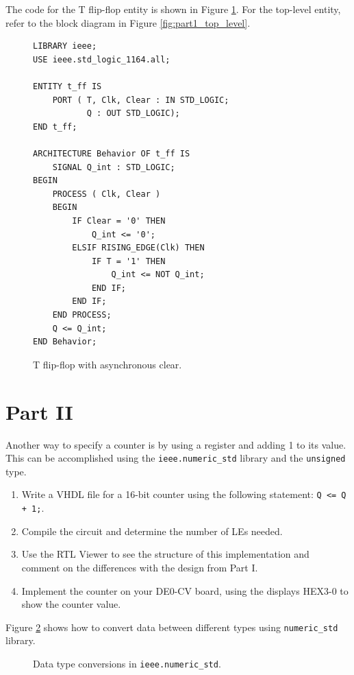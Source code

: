 \documentclass{article}
\begin{document}
The code for the T flip-flop entity is shown in Figure \ref{fig:t_ff_code}.
For the top-level entity, refer to the block diagram in Figure \ref{fig:part1_top_level}.

\begin{figure}[H]
    \centering
    \begin{verbatim}
LIBRARY ieee;
USE ieee.std_logic_1164.all;

ENTITY t_ff IS
    PORT ( T, Clk, Clear : IN STD_LOGIC;
           Q : OUT STD_LOGIC);
END t_ff;

ARCHITECTURE Behavior OF t_ff IS
    SIGNAL Q_int : STD_LOGIC;
BEGIN
    PROCESS ( Clk, Clear )
    BEGIN
        IF Clear = '0' THEN
            Q_int <= '0';
        ELSIF RISING_EDGE(Clk) THEN
            IF T = '1' THEN
                Q_int <= NOT Q_int;
            END IF;
        END IF;
    END PROCESS;
    Q <= Q_int;
END Behavior;
    \end{verbatim}
    \caption{T flip-flop with asynchronous clear.}
    \label{fig:t_ff_code}
\end{figure}

\section*{Part II}

Another way to specify a counter is by using a register and adding 1 to its value. This can be accomplished using the \texttt{ieee.numeric\_std} library and the \texttt{unsigned} type.

\begin{enumerate}
    \item Write a VHDL file for a 16-bit counter using the following statement: \texttt{Q <= Q + 1;}.
    \item Compile the circuit and determine the number of LEs needed.
    \item Use the RTL Viewer to see the structure of this implementation and comment on the differences with the design from Part I.
    \item Implement the counter on your DE0-CV board, using the displays HEX3-0 to show the counter value.
\end{enumerate}

Figure \ref{fig:numeric_std_types} shows how to convert data between different types using \texttt{numeric\_std} library.

\begin{figure}[H]
    \centering
    \resizebox{0.7\textwidth}{!}{}
    \caption{Data type conversions in \texttt{ieee.numeric\_std}.}
    \label{fig:numeric_std_types}
\end{figure}
\end{document}
